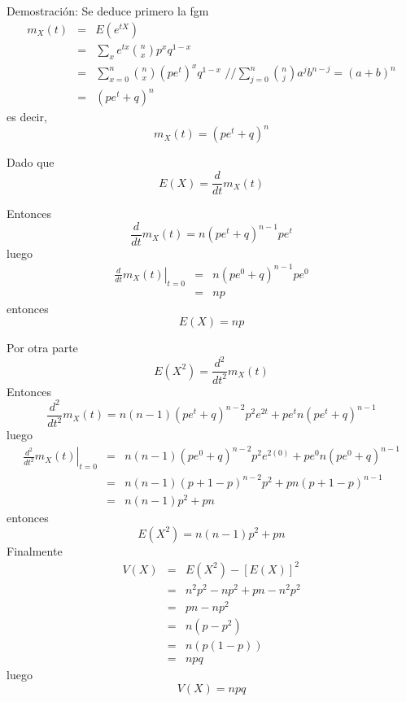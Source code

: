 \begin{i}
Demostración: Se deduce primero la fgm 
\begin{eqnarray*}
m_{X}(t) &=&E(e^{tX}) \\
&=&\sum_{x}e^{tx}\binom{n}{x}p^{x}q^{1-x} \\
&=&\sum_{x=0}^{n}\binom{n}{x}\left( pe^{t}\right) ^{x}q^{1-x}\text{ //}
\sum_{j=0}^{n}\binom{n}{j}a^{j}b^{n-j}=(a+b)^{n} \\
&=&(pe^{t}+q)^{n}
\end{eqnarray*}
es decir, 
\begin{equation*}
m_{X}(t)=(pe^{t}+q)^{n}
\end{equation*}

Dado que 
\begin{equation*}
E(X)=\frac{d}{dt}m_{X}(t)
\end{equation*}

Entonces
\begin{equation*}
\frac{d}{dt}m_{X}(t)=n(pe^{t}+q)^{n-1}pe^{t}
\end{equation*}%
luego%
\begin{eqnarray*}
\left. \frac{d}{dt}m_{X}(t)\right\vert _{t=0} &=&n(pe^{0}+q)^{n-1}pe^{0} \\
&=&np
\end{eqnarray*}%
entonces
\begin{equation*}
E(X)=np
\end{equation*}

Por otra parte
\begin{equation*}
E(X^{2})=\frac{d^{2}}{dt^{2}}m_{X}(t)
\end{equation*}
Entonces
\begin{equation*}
\frac{d^{2}}{dt^{2}}
m_{X}(t)=n(n-1)(pe^{t}+q)^{n-2}p^{2}e^{2t}+pe^{t}n(pe^{t}+q)^{n-1}
\end{equation*}
luego
\begin{eqnarray*}
\left. \frac{d^{2}}{dt^{2}}m_{X}(t)\right\vert _{t=0}
&=&n(n-1)(pe^{0}+q)^{n-2}p^{2}e^{2(0)}+pe^{0}n(pe^{0}+q)^{n-1} \\
&=&n(n-1)(p+1-p)^{n-2}p^{2}+pn(p+1-p)^{n-1} \\
&=&n(n-1)p^{2}+pn
\end{eqnarray*}
entonces
\begin{equation*}
E(X^{2})=n(n-1)p^{2}+pn
\end{equation*}
Finalmente 
\begin{eqnarray*}
V(X) &=&E(X^{2})-[E(X)]^{2} \\
&=&n^{2}p^{2}-np^{2}+pn-n^{2}p^{2} \\
&=&pn-np^{2} \\
&=&n(p-p^{2}) \\
&=&n(p(1-p)) \\
&=&npq
\end{eqnarray*}
luego%
\begin{equation*}
V(X)=npq
\end{equation*}

\end{i}
